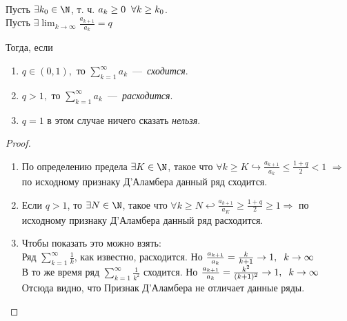 \begin{corollary}  
    \text{}\\
    Пусть $\exists k_0 \in \N$, т. ч.  $a_k \geq 0 \hspace{0.2cm} \forall k \geq k_0$. \\
    Пусть $\exists \lim_{k\rightarrow\infty}{\frac{a_{k + 1}}{a_k}} = q$

    Тогда, если
    \begin{enumerate}
        \item $q \in (0, 1),$ то $\sum_{k = 1}^{\infty} a_k$~---~\textit{сходится}.
        \item $q > 1,$ то $\sum_{k = 1}^{\infty} a_k$~---~\textit{расходится}.
        \item $q = 1$ в этом случае ничего сказать \textit{нельзя}.
    \end{enumerate}
\end{corollary}
\begin{proof}
    \text{}
    \begin{enumerate}
        \item По определению предела $\exists K \in \N$, такое что $\forall k \geq K \hookrightarrow \frac{a_{k+1}}{a_k} \leq \frac{1 + q}{2} < 1$ $\Rightarrow$ по исходному признаку Д'Аламбера данный ряд сходится.
        \item Если $q > 1$, то $\exists N \in \N$, такое что $\forall k \geq N \hookleftarrow \frac{a_{k + 1}}{a_K} \geq \frac{1 + q}{2} \geq 1 \Rightarrow$ по исходному признаку Д'Аламбера данный ряд расходится.
        \item Чтобы показать это можно взять: \\ Ряд $\sum_{k = 1}^{\infty} \frac{1}{k}$, как известно, расходится. Но $\frac{a_{k+1}}{a_k}=\frac{k}{k+1} \rightarrow 1, \hspace{0.2cm} k \rightarrow \infty$ \\
        В то же время ряд $\sum_{k = 1}^{\infty}\frac{1}{k^2}$ сходится. Но $\frac{a_{k+1}}{a_k} = \frac{k^2}{(k+1)^2}\rightarrow 1, \hspace{0.2cm} k\rightarrow \infty$ \\
        Отсюда видно, что Признак Д'Аламбера не отличает данные ряды.
    \end{enumerate}
\end{proof}

